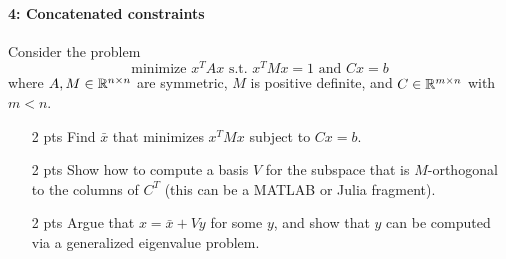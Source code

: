 \documentclass[12pt, leqno]{article} %
\begin{document}
\paragraph*{4: Concatenated constraints}
Consider the problem
\[
  \mbox{minimize } x^T A x \mbox{ s.t. } x^T M x = 1 \mbox{ and } Cx = b
\]
where $A, M \in \mathbb{R}^{n \times n}$ are symmetric, $M$ is positive definite, and $C \in
\mathbb{R}^{m \times n}$ with $m < n$.
\begin{itemize}
\item[2 pts] Find $\bar{x}$ that minimizes $x^T M x$ subject to $Cx = b$.
\item[2 pts] Show how to compute a basis $V$ for the subspace that is
  $M$-orthogonal to the columns of $C^T$ (this can be a MATLAB or
  Julia fragment).
\item[2 pts] Argue that $x = \bar{x} + Vy$ for some $y$,
  and show that $y$ can be computed via a generalized eigenvalue problem.
\end{itemize}
\end{document}
